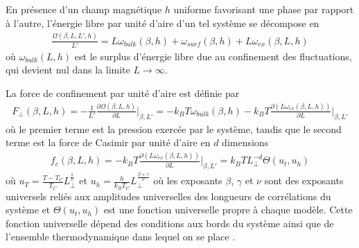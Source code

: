En présence d'un champ magnétique $h$ uniforme favorisant une phase par rapport à l'autre, l'énergie libre par unité d'aire d'un tel système se décompose \cite{lopes_cardozo_critical_2014,cardozo_finite_2015} en 
\begin{align}
    \frac{\Omega(\beta,L,L',h)}{L'} = L \omega_{bulk}(\beta,h) + \omega_{surf}(\beta,h) + L \omega_{ex}(\beta,L,h)
    \label{decomposition-energie}
\end{align}
où $\omega_{bulk}(L,h)$ est le surplus d'énergie libre due au confinement des fluctuations, qui devient nul dans la limite $L\to \infty$.

La force de confinement par unité d'aire est définie par 
\begin{align}
    F_\perp(\beta,L,h) = - \frac{1}{L' }\frac{\partial \Omega(\beta,L,h)}{\partial L} \bigg|_{\beta,L'} = - k_B T \omega_{bulk}(\beta,h) - k_B T \frac{\partial(L \omega_{ex}(\beta,L,h))}{\partial L}\bigg|_{\beta,L'}
\end{align}
où le premier terme est la pression exercée par le système, tandis que le second terme est la force de Casimir par unité d'aire \cite{vasilyev_critical_2013} en $d$ dimensions 
\begin{align}
    f_c(\beta,L,h) = - k_B T \frac{\partial(L \omega_{ex}(\beta,L,h))}{\partial L}\bigg|_{\beta,L'} = k_B T L_\perp^{-d} \Theta(u_t,u_h)
    \label{casimir-scaling}
\end{align}
où $u_T = \frac{T-T_C}{T_C} L_\perp^\frac{1}{\nu}$ et $u_h = \frac{h}{k_B T_C} L_\perp^\frac{\beta+\gamma}{\nu}$ où les exposants $\beta$, $\gamma$ et $\nu$ sont des exposants universels reliés aux amplitudes universelles des longueurs de corrélations du système \cite{pelissetto_critical_2002,vasilyev_critical_2013} et $\Theta(u_t,u_h)$ est une fonction universelle propre à chaque modèle. Cette fonction universelle dépend des conditions aux bords du système \cite{dantchev_casimir_2017,dantchev_exact_2016} ainsi que de l'ensemble thermodynamique dans lequel on se place \cite{gross_critical_2016,rohwer_transient_2017}.

